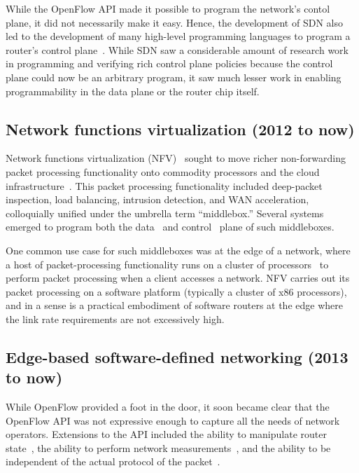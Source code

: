 While the OpenFlow API made it possible to program the network's contol plane,
it did not necessarily make it easy. Hence, the development of SDN also led to
the development of many high-level programming languages to program a router's
control plane~\cite{frenetic, pyretic}. While SDN saw a considerable amount of
research work in programming and verifying rich control plane policies because
the control plane could now be an arbitrary program, it saw much lesser work in
enabling programmability in the data plane or the router chip itself.

\subsection{Network functions virtualization (2012 to now)}
Network functions virtualization (NFV)~\cite{nfv_etsi_2012} sought to move
richer non-forwarding packet processing functionality onto commodity processors
and the cloud infrastructure~\cite{aplomb}. This packet processing
functionality included deep-packet inspection, load balancing, intrusion
detection, and WAN acceleration, colloquially unified under the umbrella term
``middlebox.'' Several systems emerged to program both the
data~\cite{netbricks} and control~\cite{opennf} plane of such middleboxes.

One common use case for such middleboxes was at the edge of a network, where a
host of packet-processing functionality runs on a cluster of
processors~\cite{e2} to perform packet processing when a client accesses a
network. NFV carries out its packet processing on a software platform
(typically a cluster of x86 processors), and in a sense is a practical
embodiment of software routers at the edge where the link rate requirements are
not excessively high.

\subsection{Edge-based software-defined networking (2013 to now)}
While OpenFlow provided a foot in the door, it soon became clear that the
OpenFlow API was not expressive enough to capture all the needs of network
operators. Extensions to the API included the ability to manipulate router
state~\cite{fast}, the ability to perform network
measurements~\cite{opensketch}, and the ability to be independent of the actual
protocol of the packet~\cite{pof}.

